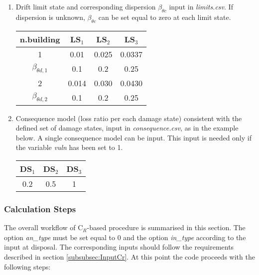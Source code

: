 \begin{enumerate}
\item Drift limit state and corresponding dispersion $\beta_{\theta c}$ input in \textit{limits.csv}. If dispersion is unknown, $\beta_{\theta c}$ can be set equal to zero at each limit state.
	\begin{table}[!htbp]
	\centering
	\begin{tabular}{|c|c|c|c|} \hline
	\textbf{n.building} & \textbf{LS$_1$} &	\textbf{LS$_2$} &	\textbf{LS$_3$} \\ \hline
	1 & 0.01 &	0.025 & 0.0337\\ \hline
	$\beta_{\theta d, 1}$ &	0.1 & 0.2 & 0.25\\ \hline
	2 & 0.014 &	0.030 & 0.0430\\ \hline
	$\beta_{\theta d, 2}$ &	0.1 & 0.2 & 0.25\\ \hline
	\end{tabular}
	\end{table}

\item Consequence model (loss ratio per each damage state) consistent with the defined set of damage states, input in \textit{consequence.csv}, as in the example below. A single consequence model can be input. This input is needed only if the variable \textit{vuln} has been set to 1.
	\begin{table}[!htbp]
	\centering
	\begin{tabular}{|c|c|c|} \hline
	\textbf{DS$_1$} & \textbf{DS$_2$} & \textbf{DS$_3$} \\ \hline
	0.2	& 0.5	 & 1\\ \hline
	\end{tabular}
	\end{table}
	
\end{enumerate}

\subsubsection{Calculation Steps}
The overall workflow of C$_R$-based procedure is summarised in this section. The option \textit{an\_type} must be set equal to 0 and the option \textit{in\_type} according to the input at disposal. The corresponding inputs should follow the requirements described in section \ref{subsubsec:InputCr}. At this point the code proceeds with the following steps:

